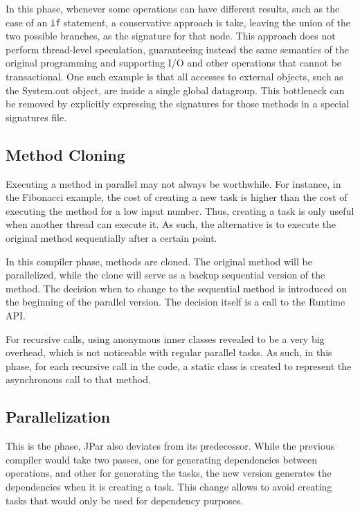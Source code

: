 \documentclass[smallextended]{svjour3}
\begin{document}
In this phase, whenever some operations can have different results, such as the case of an \texttt{if} statement, a conservative approach is take, leaving the union of the two possible branches, as the signature for that node. This approach does not perform thread-level speculation, guaranteeing instead the same semantics of the original programming and supporting I/O and other operations that cannot be transactional. One such example is that all accesses to external objects, such as the System.out object, are inside a single global datagroup. This bottleneck can be removed by explicitly expressing the signatures for those methods in a special signatures file.

\subsection{Method Cloning}

Executing a method in parallel may not always be worthwhile. For instance, in the Fibonacci example, the cost of creating a new task is higher than the cost of executing the method for a low input number. Thus, creating a task is only useful when another thread can execute it. As such, the alternative is to execute the original method sequentially after a certain point. 

In this compiler phase, methods are cloned. The original method will be parallelized, while the clone will serve as a backup sequential version of the method. The decision when to change to the sequential method is introduced on the beginning of the parallel version. The decision itself is a call to the Runtime API.

For recursive calls, using anonymous inner classes revealed to be a very big overhead, which is not noticeable with regular parallel tasks. As such, in this phase, for each recursive call in the code, a static class is created to represent the asynchronous call to that method.

\subsection{Parallelization}

This is the phase, JPar also deviates from its predecessor. While the previous compiler would take two passes, one for generating dependencies between operations, and other for generating the tasks, the new version generates the dependencies when it is creating a task. This change allows to avoid creating tasks that would only be used for dependency purposes.
\end{document}
